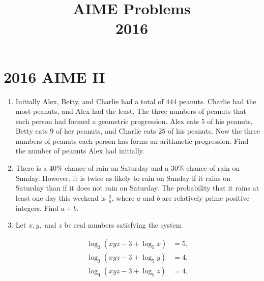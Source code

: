 \documentclass{article}
\title{AIME Problems \\ 2016}
\date{}
\begin{document}
\maketitle\thispagestyle{fancy}\newpage\section*{2016 AIME II}
\begin{enumerate}[label=\arabic*., itemsep=0.5em]
\item Initially Alex, Betty, and Charlie had a total of \(444\) peanuts. Charlie had the most peanuts, and Alex had the least. The three numbers of peanuts that each person had formed a geometric progression. Alex eats \(5\) of his peanuts, Betty eats \(9\) of her peanuts, and Charlie eats \(25\) of his peanuts. Now the three numbers of peanuts each person has forms an arithmetic progression. Find the number of peanuts Alex had initially.\par \vspace{0.5em}\item There is a \(40\%\) chance of rain on Saturday and a \(30\%\) chance of rain on Sunday. However, it is twice as likely to rain on Sunday if it rains on Saturday than if it does not rain on Saturday. The probability that it rains at least one day this weekend is \(\frac{a}{b}\), where \(a\) and \(b\) are relatively prime positive integers. Find \(a+b\).\par \vspace{0.5em}\item Let \(x,y,\) and \(z\) be real numbers satisfying the system

\begin{align*}
\log_2(xyz-3+\log_5 x)&=5,\\
\log_3(xyz-3+\log_5 y)&=4,\\
\log_4(xyz-3+\log_5 z)&=4.
\end{align*}


\end{enumerate}
\end{document}
